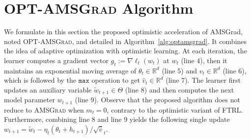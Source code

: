 \documentclass[11pt]{article}
\theoremstyle{k}
\begin{document}
\section{\textsc{OPT-AMSGrad} Algorithm}\label{sec:opt}
\vspace{-0.1in}
We formulate in this section the proposed optimistic acceleration of AMSGrad, noted \textsc{OPT-AMSGrad}, and detailed in Algorithm~\ref{alg:optamsgrad}.  
It combines the idea of adaptive optimization with optimistic learning. 
At each iteration, the learner computes a gradient vector $g_{t}:= \nabla \ell_t( w_t)$ at $w_{t}$ (line 4), then it maintains an exponential moving average of $\theta_{t} \in \mathbb R^{d}$ (line 5) and $v_{t} \in \mathbb R^{d}$ (line 6), which is followed by the $\texttt{max}$ operation to get $\hat{v}_{t} \in \mathbb R^{d}$ (line 7). 
The learner first updates an auxiliary variable $\tilde{w}_{t+1} \in \Theta$ (line 8) and then computes the next model parameter $w_{t+1}$ (line 9).
Observe that the proposed algorithm does not reduce to \textsc{AMSGrad} when $m_{t}=0$, contrary to the optimistic variant of \textsc{FTRL}.
Furthermore, combining line 8 and line 9 yields the following single update $w_{t+1}= \tilde{w}_{t}  - \eta_t (\theta_t + h_{t+1} )/ \sqrt{\hat{v}}_t $. 
\end{document}
